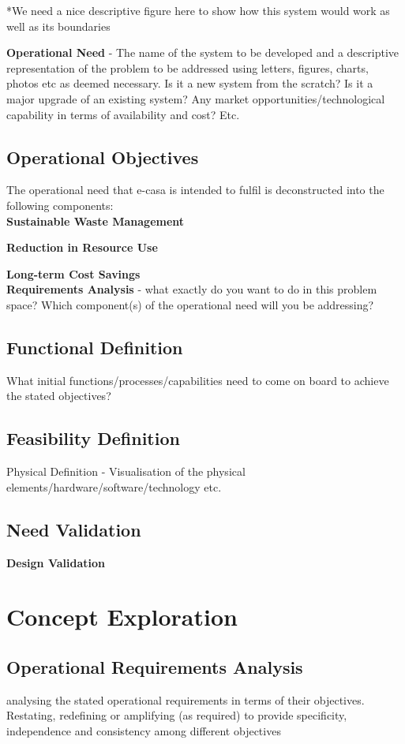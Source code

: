\documentclass[a4paper,11pt,fleqn]{report}
\begin{document}
*We need a nice descriptive figure here to show how this system would work as well as its boundaries

\textbf{Operational Need} - The name of the system to be developed and a descriptive representation of the problem to be addressed using letters, figures, charts, photos etc as deemed necessary. Is it a new system from the scratch? Is it a major upgrade of an existing system? Any market opportunities/technological capability in terms of availability and cost? Etc.

\subsection{Operational Objectives}
The operational need that \ac{e-casa} is intended to fulfil is deconstructed into the following components:\\

\textbf{Sustainable Waste Management}

\textbf{Reduction in Resource Use}

\textbf{Long-term Cost Savings}\\


\textbf{Requirements Analysis} - what exactly do you want to do in this problem space? Which component(s) of the operational need will you be addressing?

\subsection{Functional Definition}
What initial functions/processes/capabilities need to come on board to
achieve the stated objectives?

\subsection{Feasibility Definition}
Physical Definition - Visualisation of the physical elements/hardware/software/technology
etc.

\subsection{Need Validation}
\textbf{Design Validation}

\section{Concept Exploration}
\subsection{Operational Requirements Analysis}
analysing the stated operational requirements in terms of their
objectives. Restating, redefining or amplifying (as required) to provide
specificity, independence and consistency among different
objectives
\end{document}

